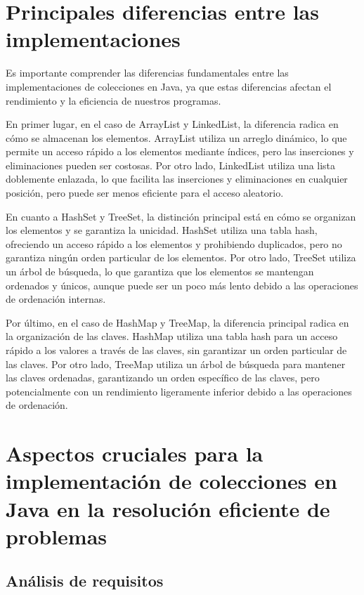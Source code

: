 \documentclass[a4paper,12pt]{article}
\begin{document}
\section{Principales diferencias entre las implementaciones}

Es importante comprender las diferencias fundamentales entre las implementaciones de colecciones en Java, ya que estas diferencias afectan el rendimiento y la eficiencia de nuestros programas.

En primer lugar, en el caso de ArrayList y LinkedList, la diferencia radica en cómo se almacenan los elementos. ArrayList utiliza un arreglo dinámico, lo que permite un acceso rápido a los elementos mediante índices, pero las inserciones y eliminaciones pueden ser costosas. Por otro lado, LinkedList utiliza una lista doblemente enlazada, lo que facilita las inserciones y eliminaciones en cualquier posición, pero puede ser menos eficiente para el acceso aleatorio.

En cuanto a HashSet y TreeSet, la distinción principal está en cómo se organizan los elementos y se garantiza la unicidad. HashSet utiliza una tabla hash, ofreciendo un acceso rápido a los elementos y prohibiendo duplicados, pero no garantiza ningún orden particular de los elementos. Por otro lado, TreeSet utiliza un árbol de búsqueda, lo que garantiza que los elementos se mantengan ordenados y únicos, aunque puede ser un poco más lento debido a las operaciones de ordenación internas.

Por último, en el caso de HashMap y TreeMap, la diferencia principal radica en la organización de las claves. HashMap utiliza una tabla hash para un acceso rápido a los valores a través de las claves, sin garantizar un orden particular de las claves. Por otro lado, TreeMap utiliza un árbol de búsqueda para mantener las claves ordenadas, garantizando un orden específico de las claves, pero potencialmente con un rendimiento ligeramente inferior debido a las operaciones de ordenación.


\section{Aspectos cruciales para la implementación de colecciones en Java en la resolución eficiente de problemas}

\subsection{Análisis de requisitos}
\end{document}

